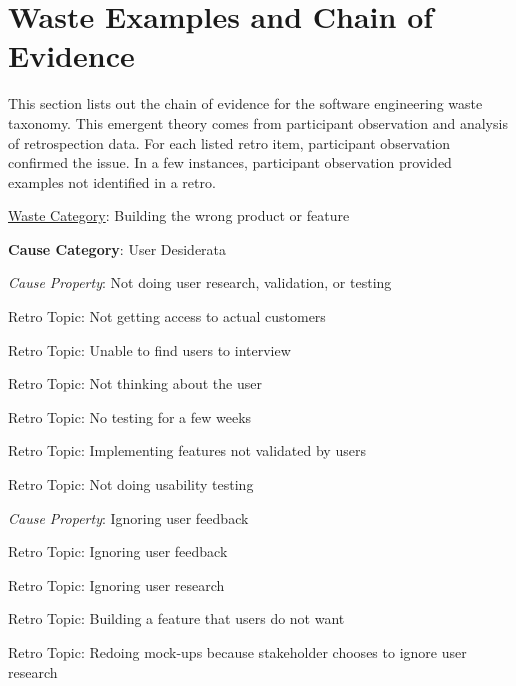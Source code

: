 
\chapter{Waste Examples and Chain of Evidence}
\label{AppendixChainOfEvidence}

This section lists out the chain of evidence for the software engineering waste taxonomy. This emergent theory comes from participant observation and analysis of retrospection data. For each listed retro item, participant observation confirmed the issue. In a few instances, participant observation provided examples not identified in a retro.




\underline{Waste Category}: Building the wrong product or feature

\quad \textbf{Cause Category}: User Desiderata

\quad \quad \textit{Cause Property}: Not doing user research, validation, or testing

\quad \quad \quad Retro Topic: Not getting access to actual customers

\quad \quad \quad Retro Topic: Unable to find users to interview

\quad \quad \quad Retro Topic: Not thinking about the user

\quad \quad \quad Retro Topic: No testing for a few weeks

\quad \quad \quad Retro Topic: Implementing features not validated by users

\quad \quad \quad Retro Topic: Not doing usability testing

\quad \quad \textit{Cause Property}: Ignoring user feedback

\quad \quad \quad Retro Topic: Ignoring user feedback

\quad \quad \quad Retro Topic: Ignoring user research

\quad \quad \quad Retro Topic: Building a feature that users do not want

\quad \quad \quad Retro Topic: Redoing mock-ups because stakeholder chooses to ignore user research

